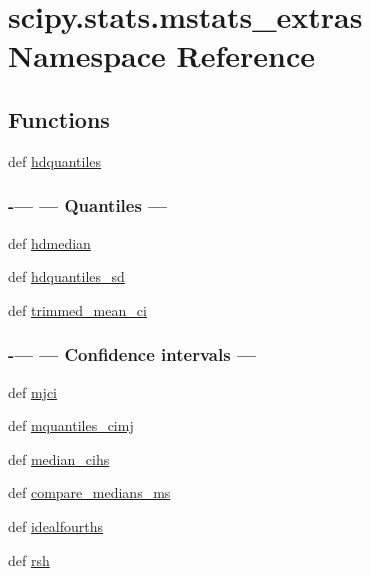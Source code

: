 \hypertarget{namespacescipy_1_1stats_1_1mstats__extras}{}\section{scipy.\+stats.\+mstats\+\_\+extras Namespace Reference}
\label{namespacescipy_1_1stats_1_1mstats__extras}
\subsection*{Functions}
\begin{DoxyCompactItemize}
\item 
def \hyperlink{namespacescipy_1_1stats_1_1mstats__extras_a2d3f3fcadb3a7356d5fab15260069986}{hdquantiles}
\begin{DoxyCompactList}\small\item\em 

 \subsubsection*{-\/--- --- Quantiles --- }\end{DoxyCompactList}\item 
def \hyperlink{namespacescipy_1_1stats_1_1mstats__extras_a5e946b37242894d6156d2e42a8cec00a}{hdmedian}
\item 
def \hyperlink{namespacescipy_1_1stats_1_1mstats__extras_a0417e161d857cf4f92ba100168e1776e}{hdquantiles\+\_\+sd}
\item 
def \hyperlink{namespacescipy_1_1stats_1_1mstats__extras_a7fcb973212337977a3b55cea96e993b0}{trimmed\+\_\+mean\+\_\+ci}
\begin{DoxyCompactList}\small\item\em 

 \subsubsection*{-\/--- --- Confidence intervals --- }\end{DoxyCompactList}\item 
def \hyperlink{namespacescipy_1_1stats_1_1mstats__extras_a6fe26b091e6cc67ddaebfccb449701fd}{mjci}
\item 
def \hyperlink{namespacescipy_1_1stats_1_1mstats__extras_ac99de9f252361537ea2eb1e78326a794}{mquantiles\+\_\+cimj}
\item 
def \hyperlink{namespacescipy_1_1stats_1_1mstats__extras_ae9bf9c879e0423a4d172ab764f0656d1}{median\+\_\+cihs}
\item 
def \hyperlink{namespacescipy_1_1stats_1_1mstats__extras_aae2592d6f4e6886d9c9116663678cfce}{compare\+\_\+medians\+\_\+ms}
\item 
def \hyperlink{namespacescipy_1_1stats_1_1mstats__extras_ac3e6df7f538a5ed78da2ab48617d9303}{idealfourths}
\item 
def \hyperlink{namespacescipy_1_1stats_1_1mstats__extras_a3d7d11297e18e17163ab40d7339b7d0f}{rsh}
\end{DoxyCompactItemize}
